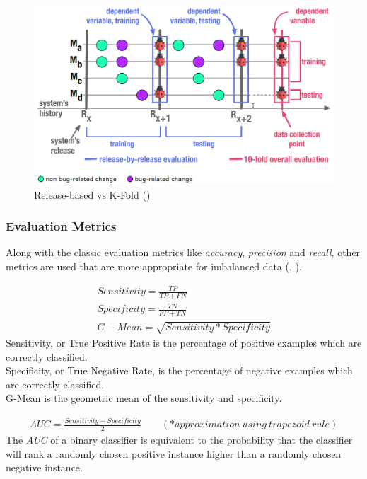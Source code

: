 \documentclass{article}
\begin{document}
\begin{figure}[H]
    \centering
    \includegraphics[scale=0.3]{./src/release_based_testing.png}
    \caption{Release-based vs K-Fold (\cite{performance_method_bug})}
    \label{kfold_vs_release}
\end{figure}

\subsubsection{Evaluation Metrics}

Along with the classic evaluation metrics like \textit{accuracy}, \textit{precision} and \textit{recall}, other metrics are used that are more appropriate for imbalanced data (\cite{comparison_metrics}, \cite{iba_metric}). 


\begin{gather*}
Sensitivity = \frac{TP}{TP + FN}\\
Specificity = \frac{TN}{FP + TN}\\
G-Mean = \sqrt{Sensitivity * Specificity}
\end{gather*} 
Sensitivity, or True Positive Rate is the percentage of positive examples which
are correctly classified.\\
Specificity, or True Negative Rate, is the percentage of negative examples which are correctly classified.\\
G-Mean is the geometric mean of the sensitivity and specificity.


\begin{gather*}
AUC = \frac{Sensitivity + Specificity}{2} \qquad (*approximation \ using \ trapezoid \ rule)
\end{gather*} 
The \textit{AUC} of a binary classifier is equivalent to the probability that the classifier will rank a randomly chosen positive instance higher than a randomly chosen negative instance.
\end{document}
